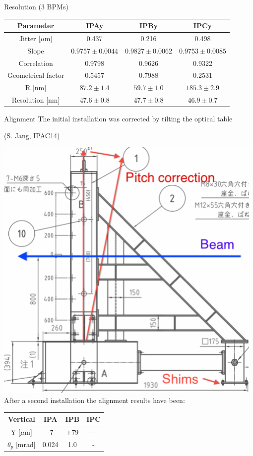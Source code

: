 \documentclass{beamer}
\begin{document}
\begin{frame}{Resolution (3 BPMs)}
{\begin{tabular}{c||c|c|c}
Parameter & IPAy & IPBy & IPCy\\ \hline\hline
Jitter [$\mu$m] & 0.437 & 0.216 & 0.498\\\hline
Slope & $0.9757\pm0.0044$ & $0.9827\pm0.0062$ & $0.9753\pm0.0085$\\\hline
Correlation & 0.9798 & 0.9626 & 0.9322 \\\hline
Geometrical factor & 0.5457 & 0.7988 & 0.2531\\\hline
R [nm] & $87.2\pm1.4$&$59.7\pm1.0$ & $185.3\pm2.9$\\\hline
Resolution [nm] & $47.6\pm0.8$ & $47.7\pm0.8$ & $46.9\pm0.7$ \\\hline
\end{tabular}
}
\end{frame}
\begin{frame}{Alignment}
 The initial installation was corrected by tilting the optical table\par
 (S. Jang, IPAC14)\par\centering
 \includegraphics[angle=0,scale=0.23]{Optictable.jpg}\\
 After a second installation the alignment results have been:\par\centering
  \begin{tabular}{c||c|c|c}\hline
 Vertical & IPA &IPB & IPC \\\hline\hline
 Y [$\mu$m] & -7 & +79 & - \\
 $\theta_p$ [mrad] & 0.024 & 1.0& -\\\hline
 \end{tabular}\par
\end{frame}
\end{document}
